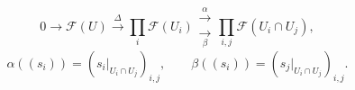 \[
0\longrightarrow \mathcal F(U)
\xrightarrow{\Delta}
\prod_i\mathcal F(U_i)
\mathrel{\substack{\xrightarrow{\ \alpha\ }\\[-0.35em]\xrightarrow[\ \beta\ ]{}}}
\prod_{i,j}\mathcal F(U_i\cap U_j),
\]
\[
\alpha((s_i))=(s_i|_{U_i\cap U_j})_{i,j},\qquad
\beta((s_i))=(s_j|_{U_i\cap U_j})_{i,j}.
\]
